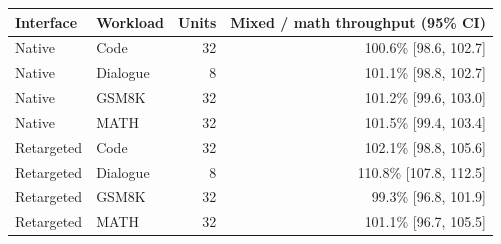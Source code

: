 \begin{tabular}{llrr}
\toprule
Interface & Workload & Units & Mixed / math throughput (95\% CI) \\
\midrule
Native & Code & 32 & 100.6\% [98.6, 102.7] \\
Native & Dialogue & 8 & 101.1\% [98.8, 102.7] \\
Native & GSM8K & 32 & 101.2\% [99.6, 103.0] \\
Native & MATH & 32 & 101.5\% [99.4, 103.4] \\
Retargeted & Code & 32 & 102.1\% [98.8, 105.6] \\
Retargeted & Dialogue & 8 & 110.8\% [107.8, 112.5] \\
Retargeted & GSM8K & 32 & 99.3\% [96.8, 101.9] \\
Retargeted & MATH & 32 & 101.1\% [96.7, 105.5] \\
\bottomrule
\end{tabular}
